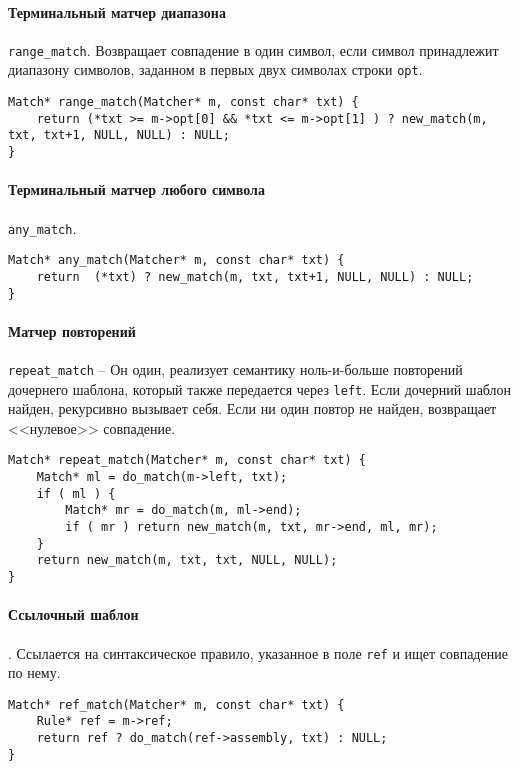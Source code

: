 \documentclass[10pt]{report}
\begin{document}
\paragraph{Терминальный матчер диапазона} {\tt range\_match}. Возвращает совпадение в один символ, если символ принадлежит диапазону символов, заданном в первых двух символах строки {\tt opt}. 
\begin{lstlisting}[firstnumber=113]
Match* range_match(Matcher* m, const char* txt) {
	return (*txt >= m->opt[0] && *txt <= m->opt[1] ) ? new_match(m, txt, txt+1, NULL, NULL) : NULL;
}
\end{lstlisting}
\paragraph{Терминальный матчер любого символа} {\tt any\_match}. 
\begin{lstlisting}[firstnumber=117]
Match* any_match(Matcher* m, const char* txt) {
	return  (*txt) ? new_match(m, txt, txt+1, NULL, NULL) : NULL;
}
\end{lstlisting}
\paragraph{Матчер повторений} {\tt repeat\_match} -- Он один, реализует семантику ноль-и-больше повторений дочернего шаблона, который также передается через {\tt left}. Если дочерний шаблон найден, рекурсивно вызывает себя. Если ни один повтор не найден, возвращает <<нулевое>> совпадение.
\begin{lstlisting}[firstnumber=121]
Match* repeat_match(Matcher* m, const char* txt) {
	Match* ml = do_match(m->left, txt);
	if ( ml ) {
		Match* mr = do_match(m, ml->end);
		if ( mr ) return new_match(m, txt, mr->end, ml, mr);
	}
	return new_match(m, txt, txt, NULL, NULL);
}
\end{lstlisting}
\paragraph{Ссылочный шаблон}.  Ссылается на синтаксическое правило, указанное в поле {\tt ref} и ищет совпадение по нему.
\begin{lstlisting}[firstnumber=130]
Match* ref_match(Matcher* m, const char* txt) {
	Rule* ref = m->ref;
	return ref ? do_match(ref->assembly, txt) : NULL;
}
\end{lstlisting}
\end{document}
